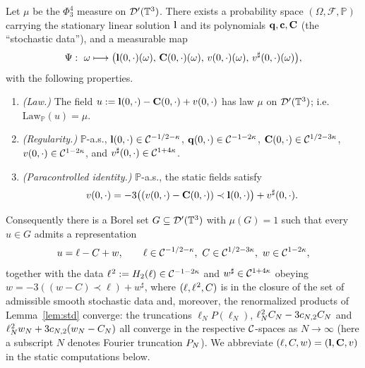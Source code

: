 \begin{qoneproposition}\label{prop:decomp}
Let $\mu$ be the $\Phi^4_3$ measure on $\mathcal{D}'(\mathbb{T}^3)$. There exists a
probability space $(\Omega,\mathcal F,\mathbb P)$ carrying the stationary linear
solution $\mathbf{l}$ and its polynomials $\mathbf{q},\mathbf{c},\mathbf{C}$ (the
``stochastic data''), and a measurable map
\[
\Psi:\ \omega\longmapsto \bigl(\qoneLin(0,\cdot)(\omega),\,\qoneIqc(0,\cdot)(\omega),\,v(0,\cdot)(\omega),\,v^\sharp(0,\cdot)(\omega)\bigr),
\]
with the following properties.
\begin{enumerate}
\item[\rm(a)] \emph{(Law.)} The field
$u:=\mathbf{l}(0,\cdot)-\mathbf{C}(0,\cdot)+v(0,\cdot)$ has law $\mu$ on
$\mathcal{D}'(\mathbb{T}^3)$; i.e.\ $\mathrm{Law}_{\mathbb P}(u)=\mu$.
\item[\rm(b)] \emph{(Regularity.)} $\mathbb P$-a.s.,
$\mathbf{l}(0,\cdot)\in\mathcal{C}^{-1/2-\kappa}$,
$\mathbf{q}(0,\cdot)\in\mathcal{C}^{-1-2\kappa}$,
$\mathbf{C}(0,\cdot)\in\mathcal{C}^{1/2-3\kappa}$,
$v(0,\cdot)\in\mathcal{C}^{1-2\kappa}$, and $v^\sharp(0,\cdot)\in\mathcal{C}^{1+4\kappa}$.
\item[\rm(c)] \emph{(Paracontrolled identity.)} $\mathbb P$-a.s., the static fields
satisfy
\begin{equation}\label{eq:v}
v(0,\cdot)=-3\bigl((v(0,\cdot)-\mathbf{C}(0,\cdot))\prec\mathbf{l}(0,\cdot)\bigr)+v^\sharp(0,\cdot).
\end{equation}
\end{enumerate}
Consequently there is a Borel set $G\subseteq\mathcal{D}'(\mathbb{T}^3)$ with $\mu(G)=1$ such
that every $u\in G$ admits a representation
\begin{equation}\label{eq:u}
u=\ell-C+w,\qquad \ell\in\qoneC^{-1/2-\kappa},\ C\in\qoneC^{1/2-3\kappa},\ w\in\qoneC^{1-2\kappa},
\end{equation}
together with the data $\ell^{\hspace{0.5pt}2}:=H_2(\ell)\in\mathcal{C}^{-1-2\kappa}$
and $w^\sharp\in\mathcal{C}^{1+4\kappa}$ obeying
$w=-3((w-C)\prec\ell)+w^\sharp$, where $(\ell,\ell^{\hspace{0.5pt}2},C)$ is in the
closure of the set of admissible smooth stochastic data and, moreover, the
renormalized products of Lemma~\ref{lem:std} converge: the truncations
$\ell_N P(\ell_N)$, $\ell^{\hspace{0.5pt}2}_N C_N-3c_{N,2}C_N$ and
$\ell^{\hspace{0.5pt}2}_N w_N+3c_{N,2}(w_N-C_N)$ all converge in the
respective $\mathcal{C}$-spaces as $N\to\infty$ (here a subscript $N$ denotes Fourier
truncation $P_N$). We abbreviate $(\ell,C,w)=(\mathbf{l},\mathbf{C},v)$ in the static
computations below.
\end{qoneproposition}

